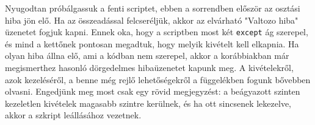 \documentclass[12pt]{article}
\begin{document}
Nyugodtan pr\'ob\'algassuk a fenti scriptet, ebben a sorrendben el\H{o}sz\"or az oszt\'asi hiba j\"on el\H{o}. Ha az 
\"osszead\'assal felcser\'elj\"uk, akkor az elv\'arhat\'o "Valtozo hiba" \"uzenetet fogjuk kapni. Ennek oka, hogy a 
scriptben most k\'et {\tt except} \'ag szerepel, \'es mind a kett\H{o}nek pontosan megadtuk, hogy melyik kiv\'etelt 
kell elkapnia. Ha olyan hiba \'allna el\H{o}, ami a k\'odban nem szerepel, akkor a kor\'abbiakban m\'ar megismerthez 
hasonl\'o  d\"orgedelmes hiba\"uzenetet kapunk meg. A kiv\'etelekr\H{o}l, azok kezel\'es\'er\H{o}l, a benne m\'eg 
rejl\H{o} lehet\H{o}s\'egekr\H{o}l a f\"uggel\'ekben fogunk b\H{o}vebben olvasni. Engedj\"unk meg most csak egy r\"ovid 
megjegyz\'est: a be\'agyazott szinten kezeletlen kiv\'etelek magasabb szintre ker\"ulnek, \'es ha ott sincsenek 
lekezelve, akkor a szkript le\'all\'as\'ahoz vezetnek. 




\end{document}
